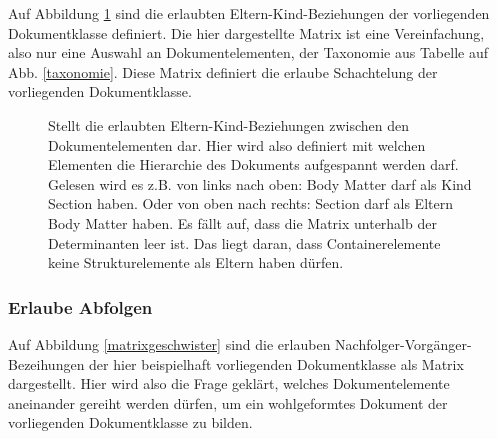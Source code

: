  
Auf Abbildung \ref{matrixkind} sind die erlaubten Eltern-Kind-Beziehungen der vorliegenden Dokumentklasse definiert. Die hier dargestellte Matrix ist eine Vereinfachung, also nur eine Auswahl an Dokumentelementen, der Taxonomie aus Tabelle auf Abb. \ref{taxonomie}. Diese Matrix definiert die erlaube Schachtelung der vorliegenden Dokumentklasse.

 
\begin{figure}[h!]
\centering
\advance\leftskip-2.5cm
\caption{ Stellt die erlaubten Eltern-Kind-Beziehungen zwischen den Dokumentelementen dar. Hier wird also definiert mit welchen Elementen die Hierarchie des Dokuments aufgespannt werden darf. Gelesen wird es z.B. von links nach oben: Body Matter darf als Kind Section haben. Oder von oben nach rechts: Section darf als Eltern Body Matter haben. Es fällt auf, dass die Matrix unterhalb der Determinanten leer ist. Das liegt daran, dass Containerelemente keine Strukturelemente als Eltern haben dürfen. }\label{matrixkind}
\end{figure}
 
\subsubsection{Erlaube Abfolgen}\label{}

 
Auf Abbildung \ref{matrixgeschwister} sind die erlauben Nachfolger-Vorgänger-Bezeihungen der hier beispielhaft vorliegenden Dokumentklasse als Matrix dargestellt. Hier wird also die Frage geklärt, welches Dokumentelemente aneinander gereiht werden dürfen, um ein wohlgeformtes Dokument der vorliegenden Dokumentklasse zu bilden.

